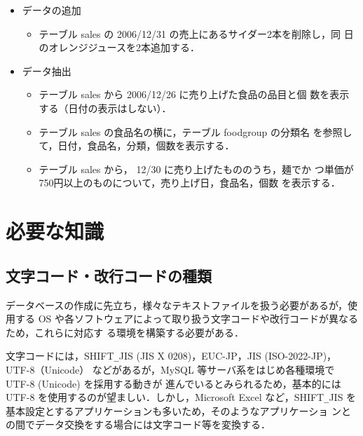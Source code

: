\begin{itemize}
 \item データの追加
       \begin{itemize}
		\item テーブル sales の 2006/12/31 の売上にあるサイダー2本を削除し，同
       日のオレンジジュースを2本追加する．
       \end{itemize}
 \item データ抽出
       \begin{itemize}
			\item テーブル sales から 2006/12/26 に売り上げた食品の品目と個
	      	数を表示する（日付の表示はしない）．
			\item テーブル sales の食品名の横に，テーブル foodgroup の分類名
	     	を参照して，日付，食品名，分類，個数を表示する．
			\item テーブル sales から， 12/30 に売り上げたもののうち，麺でか
	      つ単価が750円以上のものについて，売り上げ日，食品名，個数
	      を表示する．
       \end{itemize}
\end{itemize}

\section{必要な知識}

\subsection{文字コード・改行コードの種類}
\label{char}

データベースの作成に先立ち，様々なテキストファイルを扱う必要があるが，使用する OS や各ソフトウェアによって取り扱う文字コードや改行コードが異なるため，これらに対応す
る環境を構築する必要がある．

文字コードには，SHIFT\verb+_+JIS (JIS X 0208)，EUC-JP，JIS (ISO-2022-JP)，UTF-8（Unicode）
などがあるが，MySQL 等サーバ系をはじめ各種環境で UTF-8 (Unicode) を採用する動きが
進んでいるとみられるため，基本的には UTF-8 を使用するのが望ましい．しかし，Microsoft Excel 
など，SHIFT\verb+_+JIS を基本設定とするアプリケーションも多いため，そのようなアプリケーショ
ンとの間でデータ交換をする場合には文字コード等を変換する．

